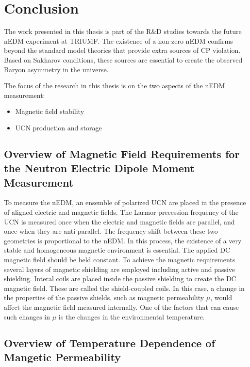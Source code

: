 \chapter{Conclusion\label{chap:overall}}


The work presented in this thesis is part of the R\&D studies towards
the future nEDM experiment at TRIUMF. The existence of a non-zero nEDM
confirms beyond the standard model theories that provide extra sources
of CP violation. Based on Sakharov conditions, these sources are
essential to create the observed Baryon asymmetry in the universe.

The focus of the research in this thesis is on the two aspects of the
nEDM measurement:
\begin{itemize}
\item Magnetic field stability
\item UCN production and storage
\end{itemize}

\section{Overview of Magnetic Field Requirements for the Neutron Electric Dipole
  Moment Measurement }
To measure the nEDM, an ensemble of polarized UCN are placed in
the presence of aligned electric and magnetic fields. The Larmor
precession frequency of the UCN is measured once when the electric and
magnetic fields are parallel, and once when they are
anti-parallel. The frequency shift between these two geometries is
proportional to the nEDM. In this process, the existence of a very
stable and homogeneous magnetic environment is essential. The applied
DC magnetic field should be held constant. To achieve the magnetic
requirements several layers of magnetic shielding are employed
including active and passive shielding. Interal coils are placed
inside the passive shielding to create the DC magnetic field. These
are called the shield-coupled coils. In this case, a change in the
properties of the passive shields, such as magnetic permeability
$\mu$, would affect the magnetic field measured internally. One of the
factors that can cause such changes in $\mu$ is the changes in the
environmental temperature.

\section{Overview of Temperature Dependence of Mangetic Permeability}

